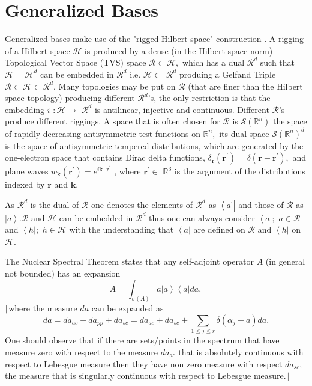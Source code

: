 \documentclass[aps,preprint]{revtex4}%
\begin{document}
\section{Generalized Bases \label{Genbasis}}

Generalized bases make use of the "rigged Hilbert space" construction
\cite{Bohm}. A rigging of a Hilbert space $\mathcal{H}$ is produced by a dense
(in the Hilbert space norm) Topological Vector Space (TVS) space
$\mathcal{R\subset H},$ which has a dual $\mathcal{R}^{d}$ such that
$\mathcal{H=H}^{d}$ can be embedded in $\mathcal{R}^{d}$ i.e.
$\mathcal{H\subset}$ $\mathcal{R}^{d}$ produing a Gelfand Triple
$\mathcal{R\subset H\subset R}^{d}.$ Many topologies may be put on
$\mathcal{R}$ (that are finer than the Hilbert space topology) producing
different $\mathcal{R}^{d}$'s, the only restriction is that the embedding
$\mathit{i}$ $:\mathcal{H\rightarrow}$ $\mathcal{R}^{d}$ is antilinear,
injective and continuous. Different $\mathcal{R}$'s produce different
riggings. A space that is often chosen for $\mathcal{R}$ is $\mathcal{S}%
\left(  \mathbb{R}^{n}\right)  $ the space of rapidly decreasing antisymmetric
test functions on $\mathbb{R}^{n},$ its dual space $\mathcal{S}\left(
\mathbb{R}^{n}\right)  ^{d}$ is the space of antisymmetric tempered
distributions, which are generated by the one-electron space that contains
Dirac delta functions, $\delta_{\mathbf{r}}\left(  \mathbf{r}^{\prime}\right)
=\delta\left(  \mathbf{r-r}^{\prime}\right)  ,$ and plane waves $w_{\mathbf{k}%
}\left(  \mathbf{r}^{\prime}\right)  =e^{i\mathbf{k\cdot r}^{\prime}}$
\cite{Bogolubov}, where $\mathbf{r}^{\prime}\in$ $\mathbb{R}^{3}$ is the
argument of the distributions indexed by $\mathbf{r}$ and $\mathbf{k}$.

As $\mathcal{R}^{d}$ is the dual of $\mathcal{R}$ one denotes the elements of
$\mathcal{R}^{d}$ as $\left\langle a^{\prime}\right\vert $ and those of
$\mathcal{R}$ as $\left\vert a\right\rangle .\mathcal{R}$ and $\mathcal{H}$
can be embedded in $\mathcal{R}^{d}$ thus one can always consider
$\left\langle a\right\vert ;$ $a\in\mathcal{R}$ and $\left\langle h\right\vert
;$ $h\in\mathcal{H}$ with the understanding that $\left\langle a\right\vert $
are defined on $\mathcal{R}$ and $\left\langle h\right\vert $ on $\mathcal{H}$.

The Nuclear Spectral Theorem \cite{Bohm} states that any self-adjoint operator
$A$ (in general not bounded) has an expansion
\begin{equation}
A=\int_{\sigma\left(  A\right)  }a\left\vert a\right\rangle \left\langle
a\right\vert da,
\end{equation}
$\lceil$where the measure $da$ can be expanded as
\begin{equation}
da=da_{ac}+da_{pp}+da_{sc}=da_{ac}+da_{sc}+\sum_{1\leq j\leq r}\delta\left(
\alpha_{j}-a\right)  da.
\end{equation}
One should observe that if there are sets/points in the spectrum that have
measure zero with respect to the measure $da_{ac}$ that is absolutely
continuous with respect to Lebesgue measure then they have non zero measure
with respect $da_{sc},$ the measure that is singularly continuous with respect
to Lebesgue measure.$\rfloor$
\end{document}
